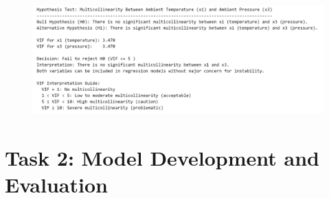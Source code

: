 \documentclass[12pt,a4paper]{article}
\begin{document}
\begin{figure}[H]
  \centering
  \includegraphics[width=\textwidth]{z15.png}
\end{figure}



\section*{Task 2: Model Development and Evaluation}






\end{document}
